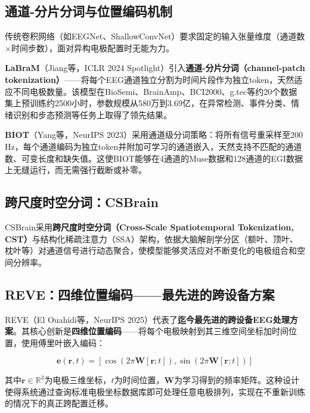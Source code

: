 \documentclass[12pt, a4paper]{article}
\begin{document}
\subsection{通道-分片分词与位置编码机制}

传统卷积网络（如EEGNet\citep{Lawhern2018EEGNet}、ShallowConvNet\citep{Schirrmeister2017EEGNet}）要求固定的输入张量维度（通道数$\times$时间步数），面对异构电极配置时无能为力。

\textbf{LaBraM}（Jiang等，ICLR 2024 Spotlight）\citep{Jiang2024LaBraM}引入\textbf{通道-分片分词（channel-patch tokenization）}——将每个EEG通道独立分割为时间片段作为独立token，天然适应不同电极数量。该模型在BioSemi、BrainAmp、BCI2000、g.tec等约20个数据集上预训练约2500小时，参数规模从580万到3.69亿，在异常检测、事件分类、情绪识别和步态预测等任务上取得了领先结果。

\textbf{BIOT}（Yang等，NeurIPS 2023）\citep{Yang2023BIOT}采用通道级分词策略：将所有信号重采样至200\,Hz，每个通道编码为独立token并附加可学习的通道嵌入，天然支持不匹配的通道数、可变长度和缺失值。这使BIOT能够在4通道的Muse数据和128通道的EGI数据上无缝运行，而无需强行截断或补零。

\subsection{跨尺度时空分词：CSBrain}

CSBrain\citep{CSBrain2025}采用\textbf{跨尺度时空分词（Cross-Scale Spatiotemporal Tokenization, CST）}与结构化稀疏注意力（SSA）架构，依据大脑解剖学分区（额叶、顶叶、枕叶等）对通道信号进行动态聚合，使模型能够灵活应对不断变化的电极组合和空间分辨率。

\subsection{REVE：四维位置编码——最先进的跨设备方案}

REVE（El Ouahidi等，NeurIPS 2025）\citep{ElOuahidi2025REVE}代表了\textbf{迄今最先进的跨设备EEG处理方案}。其核心创新是\textbf{四维位置编码}——将每个电极映射到其三维空间坐标加时间位置，使用傅里叶嵌入编码：

\begin{equation}
\mathbf{e}(\mathbf{r}, t) = \left[\cos(2\pi \mathbf{W} [\mathbf{r}; t]), \sin(2\pi \mathbf{W} [\mathbf{r}; t])\right]
\end{equation}

其中$\mathbf{r} \in \mathbb{R}^3$为电极三维坐标，$t$为时间位置，$\mathbf{W}$为学习得到的频率矩阵。这种设计使得系统通过查询标准电极坐标数据库即可处理任意电极排列，实现在不重新训练的情况下的真正跨配置迁移。
\end{document}
